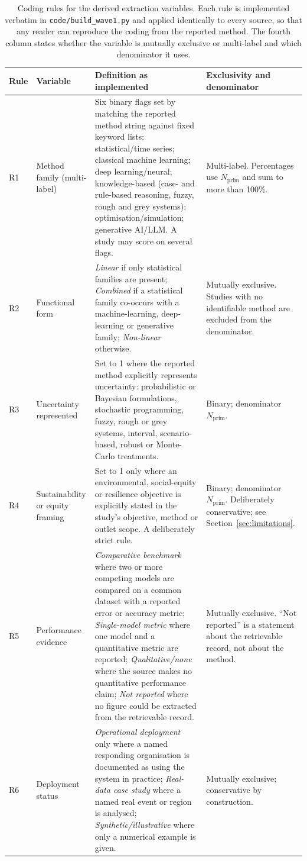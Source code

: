 \begin{table}[htbp!]
\centering
\footnotesize
\caption{Coding rules for the derived extraction variables. Each rule is implemented verbatim in \texttt{code/build\_wave1.py} and applied identically to every source, so that any reader can reproduce the coding from the reported method. The fourth column states whether the variable is mutually exclusive or multi-label and which denominator it uses.}
\label{tab:coding_rules}
\begin{tabular}{@{}p{0.7cm}p{3.0cm}p{8.0cm}p{3.6cm}@{}}
\toprule
\textbf{Rule} & \textbf{Variable} & \textbf{Definition as implemented} & \textbf{Exclusivity and denominator} \\
\midrule
R1 & Method family (multi-label) & Six binary flags set by matching the reported method string against fixed keyword lists: statistical/time series; classical machine learning; deep learning/neural; knowledge-based (case- and rule-based reasoning, fuzzy, rough and grey systems); optimisation/simulation; generative AI/LLM. A study may score on several flags. & Multi-label. Percentages use $N_{\mathrm{prim}}$ and sum to more than 100\%. \\[3pt]
R2 & Functional form & \emph{Linear} if only statistical families are present; \emph{Combined} if a statistical family co-occurs with a machine-learning, deep-learning or generative family; \emph{Non-linear} otherwise. & Mutually exclusive. Studies with no identifiable method are excluded from the denominator. \\[3pt]
R3 & Uncertainty represented & Set to 1 where the reported method explicitly represents uncertainty: probabilistic or Bayesian formulations, stochastic programming, fuzzy, rough or grey systems, interval, scenario-based, robust or Monte-Carlo treatments. & Binary; denominator $N_{\mathrm{prim}}$. \\[3pt]
R4 & Sustainability or equity framing & Set to 1 only where an environmental, social-equity or resilience objective is explicitly stated in the study's objective, method or outlet scope. A deliberately strict rule. & Binary; denominator $N_{\mathrm{prim}}$. Deliberately conservative; see Section~\ref{sec:limitations}. \\[3pt]
R5 & Performance evidence & \emph{Comparative benchmark} where two or more competing models are compared on a common dataset with a reported error or accuracy metric; \emph{Single-model metric} where one model and a quantitative metric are reported; \emph{Qualitative/none} where the source makes no quantitative performance claim; \emph{Not reported} where no figure could be extracted from the retrievable record. & Mutually exclusive. ``Not reported'' is a statement about the retrievable record, not about the method. \\[3pt]
R6 & Deployment status & \emph{Operational deployment} only where a named responding organisation is documented as using the system in practice; \emph{Real-data case study} where a named real event or region is analysed; \emph{Synthetic/illustrative} where only a numerical example is given. & Mutually exclusive; conservative by construction. \\[3pt]
\bottomrule
\end{tabular}
\normalsize
\end{table}
